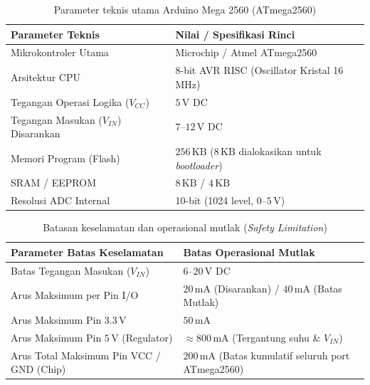 \begin{table}[H]
	\centering
	\caption{Parameter teknis utama Arduino Mega 2560 (ATmega2560)}
	\label{tab:parameter_teknis_mcu}
	\small
	\begin{tabularx}{\textwidth}{@{}l X@{}}
		\toprule
		\textbf{Parameter Teknis}              & \textbf{Nilai / Spesifikasi Rinci}                                       \\
		\midrule
		Mikrokontroler Utama                   & Microchip / Atmel ATmega2560                                             \\
		Arsitektur CPU                         & 8-bit AVR RISC (Oscillator Kristal 16 MHz)                               \\
		Tegangan Operasi Logika ($V_{CC}$)     & $5\,\text{V DC}$                                                         \\
		Tegangan Masukan ($V_{IN}$) Disarankan & $7\text{--}12\,\text{V DC}$                                              \\
		Memori Program (Flash)                 & $256\,\text{KB}$ ($8\,\text{KB}$ dialokasikan untuk \textit{bootloader}) \\
		SRAM / EEPROM                          & $8\,\text{KB}$ / $4\,\text{KB}$                                          \\
		Resolusi ADC Internal                  & 10-bit (1024 level, $0\text{--}5\,\text{V}$)                             \\
		\bottomrule
	\end{tabularx}
\end{table}

\begin{table}[H]
	\centering
	\caption{Batasan keselamatan dan operasional mutlak (\textit{Safety Limitation})}
	\label{tab:safety_limitation_mcu}
	\small
	\begin{tabularx}{\textwidth}{@{}l X@{}}
		\toprule
		\textbf{Parameter Batas Keselamatan}        & \textbf{Batas Operasional Mutlak}                             \\
		\midrule
		Batas Tegangan Masukan ($V_{IN}$)           & $6\text{--}20\,\text{V DC}$                                   \\
		Arus Maksimum per Pin I/O                   & $20\,\text{mA}$ (Disarankan) / $40\,\text{mA}$ (Batas Mutlak) \\
		Arus Maksimum Pin $3.3\,\text{V}$           & $50\,\text{mA}$                                               \\
		Arus Maksimum Pin $5\,\text{V}$ (Regulator) & $\approx 800\,\text{mA}$ (Tergantung suhu \& $V_{IN}$)        \\
		Arus Total Maksimum Pin VCC / GND (Chip)    & $200\,\text{mA}$ (Batas kumulatif seluruh port ATmega2560)    \\
		\bottomrule
	\end{tabularx}
\end{table}

